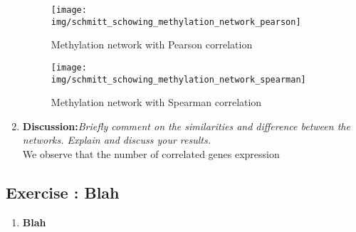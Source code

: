 \documentclass[10pt,a4paper]{article}
\newcommand{\exercise}[1]
{
  \stepcounter{subsection}
  \subsection*{Exercise \thesubsection: #1}

}
\begin{document}
\begin{enumerate}
\begin{figure}[H]
	\centering
	\texttt{[image: img/schmitt\_schowing\_methylation\_network\_pearson]}
	\caption{Methylation network with Pearson correlation}
	\label{fig:schmittschowingmethylationnetworkpearson}
\end{figure}


\begin{figure}[H]
	\centering
	\texttt{[image: img/schmitt\_schowing\_methylation\_network\_spearman]}
	\caption{Methylation network with Spearman correlation}
	\label{fig:schmittschowingmethylationnetworkspearman}
\end{figure}




	\item \textbf{Discussion:}\textit{Briefly comment on the similarities and difference between the networks.
		Explain and discuss your results.}\\
	We observe that the number of correlated genes expression 
	
	
\end{enumerate}

\newpage
\exercise{Blah}
\begin{enumerate}
	
	\item \textbf{Blah}\\
	
	
	
	
\end{enumerate}
\end{document}
